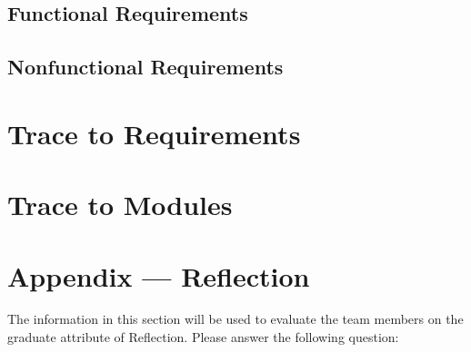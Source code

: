 \documentclass[12pt, titlepage]{article}
\begin{document}
\subsection{Functional Requirements}

\subsection{Nonfunctional Requirements}

		
\section{Trace to Requirements}
		
\section{Trace to Modules}		




\newpage{}
\section*{Appendix --- Reflection}

The information in this section will be used to evaluate the team members on the
graduate attribute of Reflection.  Please answer the following question:
\end{document}
